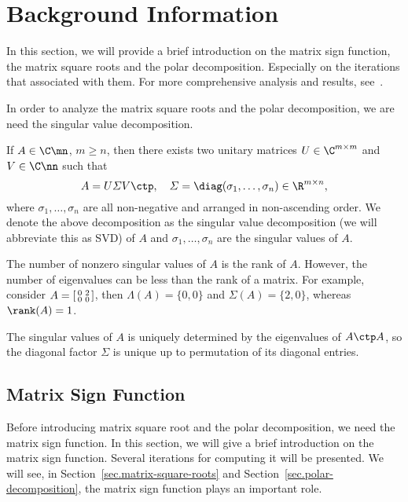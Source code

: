 \section{Background Information}
\label{sec.backgr-inform}

In this section, we will provide a brief introduction on the matrix sign
function, the matrix square roots and the polar decomposition. Especially
on the iterations that associated with them. For more comprehensive
analysis and results, see~. 

In order to analyze the matrix square roots and the polar decomposition, we
are need the singular value decomposition.

\begin{theorem}
If $A\in\C\mn$, $m\geq n$, then there exists two unitary matrices
$U\in\C^{m\times m}$ and $V \in \C\nn$ such that
\begin{equation}\notag
  A = U\varSigma V\ctp, \quad \varSigma =
  \diag(\sigma_{1},\dots,\sigma_{n})\in\R^{m\times n},
\end{equation}
where $\sigma_{1},\dots,\sigma_{n}$ are all non-negative and arranged in
non-ascending order. We denote the above decomposition as the singular
value decomposition (we will abbreviate this as SVD) of $A$ and
$\sigma_{1},\dots,\sigma_{n}$ are the singular values of $A$.
\end{theorem}

The number of nonzero singular values of $A$ is the rank of $A$. However,
the number of eigenvalues can be less than the rank of a matrix. For
example, consider $ A =
\begin{bsmallmatrix}
  0 & 2 \\ 0 & 0
\end{bsmallmatrix}
$, then $\Lambda(A) = \{0,0\}$ and $\Sigma(A) = \{2,0\}$, whereas
$\rank(A) = 1$.

The singular values of $A$ is uniquely determined by the eigenvalues of
$A\ctp A$, so the diagonal factor $\varSigma$ is unique up to permutation
of its diagonal entries.


\subsection{Matrix Sign Function}
Before introducing matrix square root and the polar decomposition, we need
the matrix sign function. In this section, we will give a brief
introduction on the matrix sign function. Several iterations for computing
it will be presented. We will see, in Section~\ref{sec.matrix-square-roots}
and Section~\ref{sec.polar-decomposition}, the matrix sign function plays
an important role.

